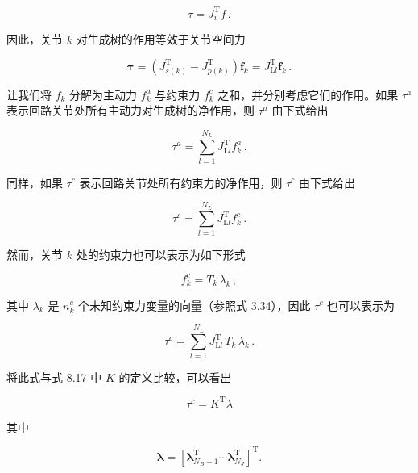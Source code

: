\documentclass[10pt,a4paper]{book}
\theoremstyle{thmstyle} %
\theoremstyle{defstyle} %
\theoremstyle{prostyle} %
\begin{document}
$$
\tau = J _ { i } ^{\mathrm { T} } f \, .
$$



因此，关节 $k$ 对生成树的作用等效于关节空间力



$$
\boldsymbol{ \tau } = ( J _ { s ( k ) } ^{\mathrm { T} } - J _ { p ( k ) } ^{\mathrm { T} } ) \boldsymbol{ f } _ { k } = J _ { \mathrm { L } l } ^{\mathrm { T} } \boldsymbol{ f } _ { k } \, .
$$



让我们将 $f_k$ 分解为主动力 $f_k^a$ 与约束力 $f_k^c$ 之和，并分别考虑它们的作用。如果 $\tau^a$ 表示回路关节处所有主动力对生成树的净作用，则 $\tau^a$ 由下式给出



$$
\tau ^{a} = \sum _ { l = 1 } ^{N _ { L} } J _ { \mathrm { L } l } ^{\mathrm { T} } f _ { k } ^{a} \, .
$$



同样，如果 $\tau^{c}$ 表示回路关节处所有约束力的净作用，则 $\tau^{c}$ 由下式给出



$$
\tau ^{c} = \sum _ { l = 1 } ^{N _ { L} } J _ { \mathrm { L } l } ^{\mathrm { T} } f _ { k } ^{c} \, .
$$



然而，关节 $k$ 处的约束力也可以表示为如下形式



$$
f _ { k } ^{c} = T _ { k } \, \lambda _ { k } \, ,
$$



其中 $\lambda_{k}$ 是 $n_{k}^{c}$ 个未知约束力变量的向量（参照式 3.34），因此 $\tau^{c}$ 也可以表示为



$$
\tau ^{c} = \sum _ { l = 1 } ^{N _ { L} } J _ { \mathrm { L } l } ^{\mathrm { T} } \, T _ { k } \, \lambda _ { k } \, .
$$



将此式与式 8.17 中 $K$ 的定义比较，可以看出



$$
\tau ^{c} = K ^{\mathrm { T} } \lambda
$$



其中



$$
\boldsymbol { \lambda } = \left[ \boldsymbol { \lambda } _ { N _ { B } + 1 } ^{\mathrm { T} }  \cdots  \boldsymbol { \lambda } _ { N _ { J } } ^{\mathrm { T} } \right] ^{\mathrm { T} } .
$$
\end{document}
